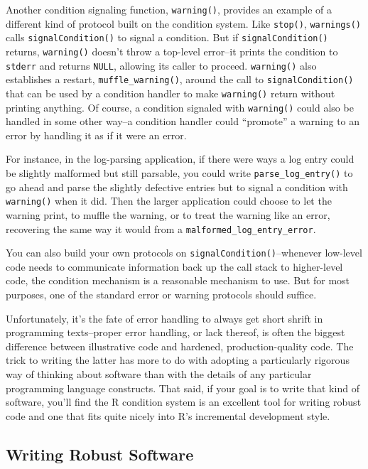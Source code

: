 Another condition signaling function, \texttt{warning()}, provides an
example of a different kind of protocol built on the condition system.
Like \texttt{stop()}, \texttt{warnings()} calls
\texttt{signalCondition()} to signal a condition. But if
\texttt{signalCondition()} returns, \texttt{warning()} doesn't throw a
top-level error--it prints the condition to \texttt{stderr} and returns
\texttt{NULL}, allowing its caller to proceed. \texttt{warning()} also
establishes a restart, \texttt{muffle\_warning()}, around the call to
\texttt{signalCondition()} that can be used by a condition handler to
make \texttt{warning()} return without printing anything. Of course, a
condition signaled with \texttt{warning()} could also be handled in some
other way--a condition handler could ``promote'' a warning to an error
by handling it as if it were an error.

For instance, in the log-parsing application, if there were ways a log
entry could be slightly malformed but still parsable, you could write
\texttt{parse\_log\_entry()} to go ahead and parse the slightly
defective entries but to signal a condition with \texttt{warning()} when
it did. Then the larger application could choose to let the warning
print, to muffle the warning, or to treat the warning like an error,
recovering the same way it would from a
\texttt{malformed\_log\_entry\_error}.

You can also build your own protocols on
\texttt{signalCondition()}--whenever low-level code needs to communicate
information back up the call stack to higher-level code, the condition
mechanism is a reasonable mechanism to use. But for most purposes, one
of the standard error or warning protocols should suffice.

Unfortunately, it's the fate of error handling to always get short
shrift in programming texts--proper error handling, or lack thereof, is
often the biggest difference between illustrative code and hardened,
production-quality code. The trick to writing the latter has more to do
with adopting a particularly rigorous way of thinking about software
than with the details of any particular programming language constructs.
That said, if your goal is to write that kind of software, you'll find
the R condition system is an excellent tool for writing robust code and
one that fits quite nicely into R's incremental development style.

\subsection{Writing Robust Software}

